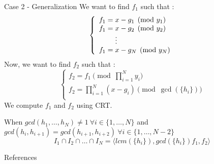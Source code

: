 \documentclass{beamer}
\begin{document}
\begin{frame}{Case 2 - Generalization}
    We want to find $f_{1}$ such that :
\begin{displaymath}
    \left\{
    \begin{array}{ll}
        f_{1} = x-g_{1} \pmod {y_{1}} \\
        f_{1} = x-g_{2} \pmod {y_{2}} \\
        \hspace{8mm} \vdots \\
        f_{1} = x-g_{N} \pmod{y_{N}}\\
    \end{array}
    \right.
\end{displaymath}
    Now, we want to find $f_{2}$ such that :
\begin{displaymath}
    \left\{
    \begin{array}{ll}
        f_{2} = f_{1} \pmod {\prod_{i=1}^{N} y_{i}} \\
        f_{2} = \prod^{N}_{i=1} (x-g_{i}) \pmod {\gcd(\{h_{i}\})} \\
    \end{array}
    \right.
\end{displaymath}
We compute $f_1$ and $f_2$ using CRT.

\begin{theorem}
    When $gcd(h_{1},\dots,h_{N})\neq1\ \forall i \in \{1,\dots,N\}$ and $gcd(h_{i},h_{i+1})=gcd(h_{i+1},h_{i+2})\ \forall i \in \{1,\dots,N-2\}$
    \begin{displaymath}
        I_{1} \cap I_{2} \cap \dots \cap I_{N} = \langle lcm(\{h_{i}\}), gcd(\{h_{i}\})f_{1},f_{2} \rangle
    \end{displaymath}
\end{theorem}
\end{frame}

\begin{frame}{References}
    \nocite{*}
    \printbibliography
\end{frame}
\end{document}
